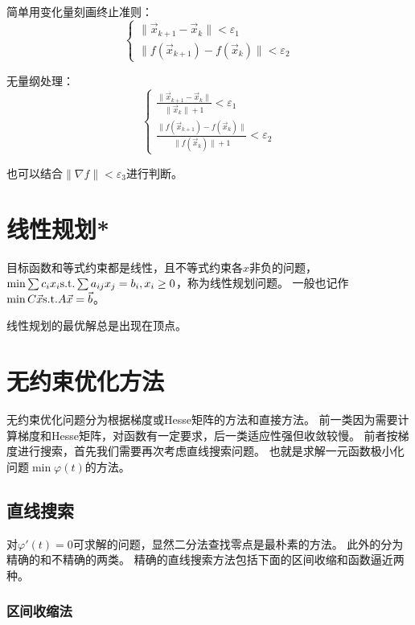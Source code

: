 简单用变化量刻画终止准则：
\[
    \begin{cases}
        \| \vec{x}_{k+1} - \vec{x}_k \| < \varepsilon_1\\
        \| f(\vec{x}_{k+1}) - f(\vec{x}_k) \| < \varepsilon_2
    \end{cases}
\]

无量纲处理：
\[
    \begin{cases}
        \frac{\| \vec{x}_{k+1} - \vec{x}_k \|}{\|\vec{x}_k\|+1} < \varepsilon_1\\
        \frac{\| f(\vec{x}_{k+1}) - f(\vec{x}_k) \|}{\|f(\vec{x}_k)\|+1} < \varepsilon_2
    \end{cases}
\]

也可以结合$\|\nabla f\|<\varepsilon_3$进行判断。

\section{线性规划*}

\begin{definition}
    目标函数和等式约束都是线性，且不等式约束各$x$非负的问题，
    $\min \sum c_i x_i \mathrm{s.t.} \sum a_{ij} x_j = b_i, x_i\geq 0$，称为线性规划问题。
    一般也记作$\min C\vec{x} \mathrm{s.t.} A\vec{x}=\vec{b}$。
\end{definition}

线性规划的最优解总是出现在顶点。

\section{无约束优化方法}

无约束优化问题分为根据梯度或Hesse矩阵的方法和直接方法。
前一类因为需要计算梯度和Hesse矩阵，对函数有一定要求，后一类适应性强但收敛较慢。
前者按梯度进行搜索，首先我们需要再次考虑直线搜索问题。
也就是求解一元函数极小化问题$\min \varphi(t)$的方法。

\subsection{直线搜索}

对$\varphi'(t)=0$可求解的问题，显然二分法查找零点是最朴素的方法。
此外的分为精确的和不精确的两类。
精确的直线搜索方法包括下面的区间收缩和函数逼近两种。

\subsubsection{区间收缩法}

